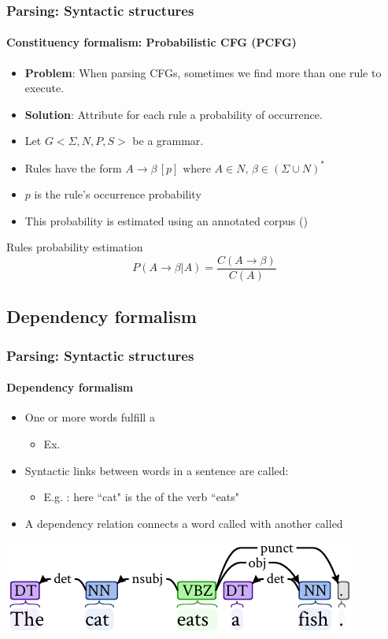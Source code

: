 \documentclass[xcolor=table]{beamer}
\begin{document}
\begin{frame}
\frametitle{Parsing: Syntactic structures}
\framesubtitle{Constituency formalism: Probabilistic CFG (PCFG)}

\begin{itemize}
	\item \textbf{Problem}: When parsing CFGs, sometimes we find more than one rule to execute.
	\item \textbf{Solution}: Attribute for each rule a probability of occurrence.
	\item Let $G <\Sigma, N, P, S>$ be a grammar.
	\item Rules have the form $A \rightarrow \beta\, [p] \text{ where } A \in N,\, \beta \in (\Sigma \cup N)^*$
	\item $p$ is the rule's occurrence probability
	\item This probability is estimated using an annotated corpus ()
\end{itemize}

\begin{block}{Rules probability estimation}
	\[
	P(A \rightarrow \beta | A) = \frac{C(A \rightarrow \beta)}{C(A)}
	\]
\end{block}

\end{frame}

\subsection{Dependency formalism}

\begin{frame}
\frametitle{Parsing: Syntactic structures}
\framesubtitle{Dependency formalism}

\begin{itemize}
	\item One or more words fulfill a 
	\begin{itemize}
		\item Ex. 
	\end{itemize}
	\item Syntactic links between words in a sentence are called: 
	\begin{itemize}
		\item E.g. : here ``cat" is the  of the verb ``eats"
	\end{itemize}
	\item A dependency relation connects a word called  with another called 
\end{itemize}

\includegraphics[width=\textwidth]{../img/intro/dep_gram_.pdf}

\end{frame}
\end{document}
